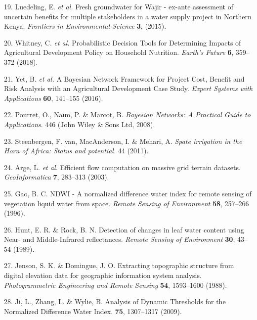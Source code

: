\documentclass[12pt,oneside]{article}
\begin{document}
\leavevmode\hypertarget{ref-Luedeling_et_al_2015}{}%
19. Luedeling, E. \emph{et al.} Fresh groundwater for Wajir - ex-ante
assessment of uncertain benefits for multiple stakeholders in a water
supply project in Northern Kenya. \emph{Frontiers in Environmental
Science} \textbf{3}, (2015).

\leavevmode\hypertarget{ref-Whitney_et_al_2018a}{}%
20. Whitney, C. \emph{et al.} Probabilistic Decision Tools for
Determining Impacts of Agricultural Development Policy on Household
Nutrition. \emph{Earth's Future} \textbf{6}, 359--372 (2018).

\leavevmode\hypertarget{ref-Yet_et_al_2016}{}%
21. Yet, B. \emph{et al.} A Bayesian Network Framework for Project Cost,
Benefit and Risk Analysis with an Agricultural Development Case Study.
\emph{Expert Systems with Applications} \textbf{60}, 141--155 (2016).

\leavevmode\hypertarget{ref-Pourret_et_al_2008}{}%
22. Pourret, O., Naïm, P. \& Marcot, B. \emph{Bayesian Networks: A
Practical Guide to Applications}. 446 (John Wiley \& Sons Ltd, 2008).

\leavevmode\hypertarget{ref-VanSteenbergen_et_al_2011}{}%
23. Steenbergen, F. van, MacAnderson, I. \& Mehari, A. \emph{Spate
irrigation in the Horn of Africa: Status and potential.} 44 (2011).

\leavevmode\hypertarget{ref-Arge_et_al_2003}{}%
24. Arge, L. \emph{et al.} Efficient flow computation on massive grid
terrain datasets. \emph{GeoInformatica} \textbf{7}, 283--313 (2003).

\leavevmode\hypertarget{ref-Gao_1996}{}%
25. Gao, B. C. NDWI - A normalized difference water index for remote
sensing of vegetation liquid water from space. \emph{Remote Sensing of
Environment} \textbf{58}, 257--266 (1996).

\leavevmode\hypertarget{ref-Hunt_and_Rock_1989}{}%
26. Hunt, E. R. \& Rock, B. N. Detection of changes in leaf water
content using Near- and Middle-Infrared reflectances. \emph{Remote
Sensing of Environment} \textbf{30}, 43--54 (1989).

\leavevmode\hypertarget{ref-Jenson_and_Domingue_1988}{}%
27. Jenson, S. K. \& Domingue, J. O. Extracting topographic structure
from digital elevation data for geographic information system analysis.
\emph{Photogrammetric Engineering and Remote Sensing} \textbf{54},
1593--1600 (1988).

\leavevmode\hypertarget{ref-Ji_et_al_2009}{}%
28. Ji, L., Zhang, L. \& Wylie, B. Analysis of Dynamic Thresholds for
the Normalized Difference Water Index. \textbf{75}, 1307--1317 (2009).
\end{document}
